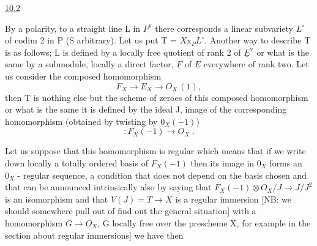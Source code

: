 
\uline{10.2}

By a polarity, to a straight line L in $P^{\mathrm{v}}$ there corresponds a
linear subvariety $L^{\circ}$ of codim 2 in P (S arbitrary).  Let us put T =
$X \mathrm{x}_{P} L^{\circ}$.  Another way to describe T is as follows; L is defined by
a locally free quotient of rank 2 of $\underline{E}^{\mathrm{v}}$ or what is the same by a
submodule, locally a direct factor, $\underline{F}$ of $\underline{E}$ everywhere of rank two.
Let us consider the composed homomorphism
\[ F_{X} \to E_{X} \to O_{X}\,(1), \]
then T is nothing else but the scheme of zeroes of this composed
homomorphism or what is the same it is defined by the ideal J,
image of the corresponding homomorphism (obtained by twisting by
$0_{X}(-1)$)
\[ : F_{X}(-1) \to O_{X} \;. \]

Let us suppose that this homomorphism is regular which means
that if we write down locally a totally ordered basis of $F_{X}(-1)$
then its image in $0_{X}$ forms an $0_{X}$ - regular sequence, a condition
that does not depend on the basis chosen and that can be announced
intrinsically also by saying that $F_{X}(-1) \otimes O_{X}/J \to J/J^{2}$ is an
isomorphism and that $V(J) = T \to X$ is a regular immersion [NB: we
should somewhere pull out of find out the general situation] with
a homomorphism $G \to O_{X}$, G locally free over the prescheme X, for
example in the section about regular immersions] we have then
